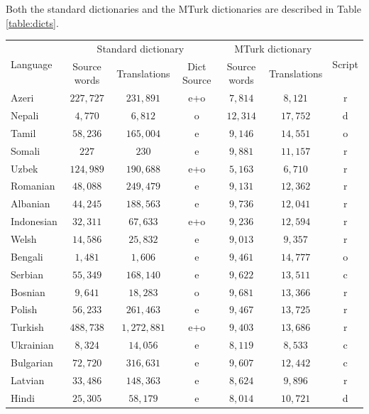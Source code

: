 \documentclass[11pt]{article}
\begin{document}
Both the standard dictionaries and the MTurk dictionaries are described in Table \ref{table:dicts}.

\begin{table}\footnotesize
\begin{center}
\begin{tabular}{|l||c|c|c||c|c||c|}
\hline
\multirow{2}{*}{Language} & \multicolumn{3}{|c||}{Standard dictionary} & \multicolumn{2}{|c||}{MTurk dictionary} & \multirow{2}{*}{Script}\\ \cline{2-6}
& Source words &Translations & Dict Source & Source words & Translations & \\
\hline
Azeri  & $227,727$ & $231,891$ &  e+o & $7,814$ & $8,121$ & r \\
Nepali  & $4,770$ & $6,812$ &  o & $12,314$ & $17,752$ & d \\
Tamil  & $58,236$ & $165,004$ &   e  & $9,146$ & $14,551$ & o \\
Somali  & $227$ & $230$ &   e & $9,881$ & $11,157$ & r \\
Uzbek  & $124,989$ & $190,688$ & e+o & $5,163$ & $6,710$ & r \\
Romanian  & $48,088$ & $249,479$ &  e & $9,131$ & $12,362$ & r \\
Albanian  & $44,245$ & $188,563$ &  e  & $9,736$ & $12,041$ & r\\
Indonesian  & $32,311$ &  $67,633$ & e+o & $9,236$ & $12,594$ & r\\
Welsh  & $14,586$ &  $25,832$ &   e & $9,013$ & $9,357$ & r\\
Bengali  & $1,481$ & $1,606$   & e & $9,461$ & $14,777$ & o \\
Serbian  &  $55,349$ & $168,140$ & e & $9,622$ & $13,511$ & c\\
Bosnian    & $9,641$ & $18,283$ & o & $9,681$ & $13,366$ & r\\
Polish  & $56,233$ &  $261,463$ &   e & $9,467$ &  $13,725$ & r\\
Turkish  & $488,738$ &  $1,272,881$  & e+o & $9,403$ &  $13,686$ & r \\
Ukrainian    & $8,324$ & $14,056$ &  e   & $8,119$ & $8,533$ & c\\
Bulgarian  & $72,720$ & $316,631$ &  e  & $9,607$ &  $12,442$ & c \\
Latvian  & $33,486$ & $148,363$ &   e & $8,624$ &  $9,896$ & r \\
Hindi  & $25,305$ & $58,179$ &   e & $8,014$ & $10,721$ & d\\

\end{tabular}
\end{center}
\end{table}
\end{document}
